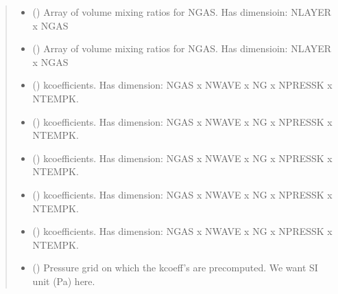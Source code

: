 \documentclass[letterpaper,10pt,english]{sphinxmanual}
\begin{document}
\begin{fulllineitems}
\begin{quote}
\begin{description}
\begin{itemize}
\item {} 
\sphinxAtStartPar
{}\sphinxstyleliteralstrong{\sphinxupquote{(}} () \textendash{} Array of volume mixing ratios for NGAS.
Has dimensioin: NLAYER x NGAS

\item {} 
\sphinxAtStartPar
{}\sphinxstyleliteralstrong{\sphinxupquote{)}} () \textendash{} Array of volume mixing ratios for NGAS.
Has dimensioin: NLAYER x NGAS

\item {} 
\sphinxAtStartPar
{}\sphinxstyleliteralstrong{\sphinxupquote{(}} () \textendash{} k\sphinxhyphen{}coefficients.
Has dimension: NGAS x NWAVE x NG x NPRESSK x NTEMPK.

\item {} 
\sphinxAtStartPar
{} () \textendash{} k\sphinxhyphen{}coefficients.
Has dimension: NGAS x NWAVE x NG x NPRESSK x NTEMPK.

\item {} 
\sphinxAtStartPar
{} () \textendash{} k\sphinxhyphen{}coefficients.
Has dimension: NGAS x NWAVE x NG x NPRESSK x NTEMPK.

\item {} 
\sphinxAtStartPar
{} () \textendash{} k\sphinxhyphen{}coefficients.
Has dimension: NGAS x NWAVE x NG x NPRESSK x NTEMPK.

\item {} 
\sphinxAtStartPar
{}\sphinxstyleliteralstrong{\sphinxupquote{)}} () \textendash{} k\sphinxhyphen{}coefficients.
Has dimension: NGAS x NWAVE x NG x NPRESSK x NTEMPK.

\item {} 
\sphinxAtStartPar
{}\sphinxstyleliteralstrong{\sphinxupquote{(}}\sphinxstyleliteralstrong{\sphinxupquote{)}} () \textendash{} Pressure grid on which the k\sphinxhyphen{}coeff’s are pre\sphinxhyphen{}computed.
We want SI unit (Pa) here.


\end{itemize}
\end{description}
\end{quote}
\end{fulllineitems}
\end{document}
